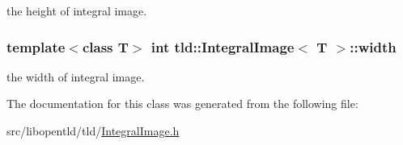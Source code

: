 the height of integral image. 

\hypertarget{classtld_1_1IntegralImage_af8ea5fee24e9726087c0e9f6159141e8}{
\subsubsection[{width}]{\setlength{\rightskip}{0pt plus 5cm}template$<$class T$>$ int {\bf tld\-::\-Integral\-Image}$<$ T $>$\-::width}}\label{classtld_1_1IntegralImage_af8ea5fee24e9726087c0e9f6159141e8}


the width of integral image. 



The documentation for this class was generated from the following file\-:\begin{DoxyCompactItemize}
\item 
src/libopentld/tld/\hyperlink{IntegralImage_8h}{Integral\-Image.\-h}\end{DoxyCompactItemize}
